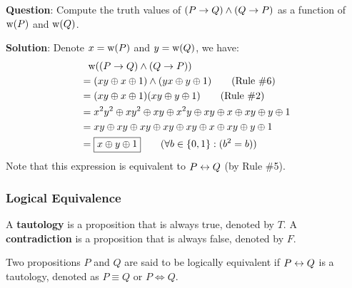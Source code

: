 \begin{example}
    \textbf{Question}: Compute the truth values of $(P \rightarrow Q) \wedge (Q \rightarrow P)$ as a function of
    $\text{w(}P\text{)}$ and $\text{w(}Q\text{)}$.

    \textbf{Solution}: Denote $x=\text{w(}P\text{)}$ and $y=\text{w(}Q\text{)}$, we have:
    \begin{align*}
        &\phantom{\mathrel{=}} \lTV{(P \lImp Q) \lAnd (Q \lImp P)} \\
        &= (xy \lXor x \lXor 1) \lAnd (yx \lXor y \lXor 1) \qquad\text{(Rule \#6)} \\
        &= (xy \lXor x \lXor 1)(xy \lXor y \lXor 1) \qquad\text{(Rule \#2)} \\
        &= x^2y^2 \lXor xy^2 \lXor xy \lXor x^2y \lXor xy \lXor x \lXor xy \lXor y \lXor 1 \\
        &= xy \lXor xy \lXor xy \lXor xy \lXor xy \lXor x \lXor xy \lXor y \lXor 1 \\
        &= \boxed{x \lXor y \lXor 1} \qquad\text{(}\forall b\in\{0, 1\}:(b^2 = b)\text{)}
    \end{align*}
    Note that this expression is equivalent to $P \leftrightarrow Q$ (by Rule \#5).
\end{example}

\subsubsection{Logical Equivalence}

\begin{definition}
    A \textbf{tautology} is a proposition that is always true, denoted by $T$.
    A \textbf{contradiction} is a proposition that is always false, denoted by $F$.
\end{definition}

\begin{definition}
    Two propositions $P$ and $Q$ are said to be logically equivalent if $P \leftrightarrow Q$ is a tautology,
    denoted as $P \equiv Q$ or $P \Leftrightarrow Q$.
\end{definition}

